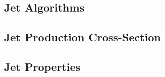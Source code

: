 \subsection{Jet Algorithms}
\label{sec:jet_algos}
\subsection{Jet Production Cross-Section}

\subsection{Jet Properties}
\begin{comment}
\section{Leading order and next-to-leading order calculations}

A perturbative expansion in $\alpha_{s}$ is generally performed to calculate
measurable quantities in QCD. Physical quantities are calculated 
by separating processes at different orders in $\alpha_{s}$.
At leading order only two jets can exist. Calculations at LO allow for
only 
$gg \rightarrow gg$,
$qq \rightarrow qq$, 
$qg \rightarrow qg$,
$q\bar{q} \rightarrow q\bar{q}$,
$q\bar{q} \rightarrow gg$, and
$gg \rightarrow q\bar{q}$.
Figure shows some of the diagrams which
contribute to leading order parton-parton scattering.
Each vertex in these diagrams is proportional to $\alpha_{s}$. Since 
each diagram at LO has two vertices, calculations can only be performed
at order O($\alpha^{2}_{s}$).
Typically leading order calculations depend heavily upon the choice
of renormalization scale, leading to uncertainties in most LO calculations
of about 30\%.
In order to reduce the theoretical uncertainties, 
higher order diagrams can be introduced. 
As more terms are included in the perturbative expansion, 
the dependence on $\mu$ decreases, reducing the theoretical uncertainties.

At next-to-leading order, calculations may include three 
jet events, because diagrams such as $gg \rightarrow ggg$ are now possible. 
NLO must also include a larger number of two jet diagrams arising from loops.
Figure \ref{FIG:nlo_diagrams} shows some of the diagrams contributing to
NLO parton-parton scattering.
At NLO, each diagram has either three or four vertices, allowing
calculations of order O($\alpha^{3}_{s}$) to be performed. 
Terms which are of order O($\alpha^{4}_{s}$) are ignored.
NLO is much less sensitive to the renormalization scale. Calculations at this
order typically have errors of $\sim$ 10\%. 
 

\end{comment}
